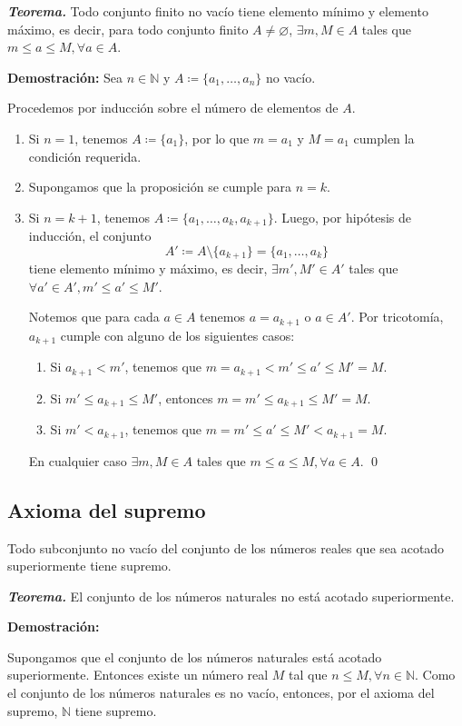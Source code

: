 \documentclass[11pt]{article}
\newcommand{\N}{\mathbb{N}}
\let\emptyset\varnothing
\begin{document}
\textbf{\textit{Teorema.}} Todo conjunto finito no vacío tiene elemento mínimo y elemento máximo, es decir, para todo conjunto finito $A\neq \emptyset$, $\exists m,M\in A$ tales que $m\leq a\leq M, \forall a\in A$.

\textbf{Demostración:} Sea $n\in \N$ y $A \coloneqq \{a_1, \dots, a_n\}$ no vacío.

Procedemos por inducción sobre el número de elementos de $A$. \begin{enumerate}[label=\roman*)]
    \item Si $n=1$, tenemos $A\coloneqq\{a_1\}$, por lo que $m=a_1$ y $M=a_1$ cumplen la condición requerida.
    \item Supongamos que la proposición se cumple para $n=k$.
    \item Si $n=k+1$, tenemos $A\coloneqq \{a_1, \dots, a_k, a_{k+1}\}$. Luego, por hipótesis de inducción, el conjunto \[A' \coloneqq A \setminus \{a_{k+1}\} = \{a_1, \dots, a_k\}\] tiene elemento mínimo y máximo, es decir, $\exists m',M'\in A'$ tales que $\forall a'\in A', m'\leq a' \leq M'$.
    
    Notemos que para cada $a\in A$ tenemos $a=a_{k+1}$ o $a\in A'$. Por tricotomía, $a_{k+1}$ cumple con alguno de los siguientes casos:
    \begin{enumerate}[label=\alph*)]
        \item Si $a_{k+1}<m'$, tenemos que $m=a_{k+1}<m'\leq a' \leq M'=M$.
        \item Si $m' \leq a_{k+1}\leq M'$, entonces $m=m'\leq a_{k+1} \leq M'=M$.
        \item Si $m'<a_{k+1}$, tenemos que $m=m'\leq a' \leq M'<a_{k+1}=M$.
    \end{enumerate}
    En cualquier caso $\exists m,M\in A$ tales que $m\leq a\leq M, \forall a\in A$. \qed
\end{enumerate}

\subsection*{Axioma del supremo}

Todo subconjunto no vacío del conjunto de los números reales que sea acotado superiormente tiene supremo.

\textbf{\textit{Teorema.}} El conjunto de los números naturales no está acotado superiormente.

\textbf{Demostración:}

Supongamos que el conjunto de los números naturales está acotado superiormente. Entonces existe un número real $M$ tal que $n\leq M, \forall n\in \N$. Como el conjunto de los números naturales es no vacío, entonces, por el axioma del supremo, $\N$ tiene supremo.
\end{document}
